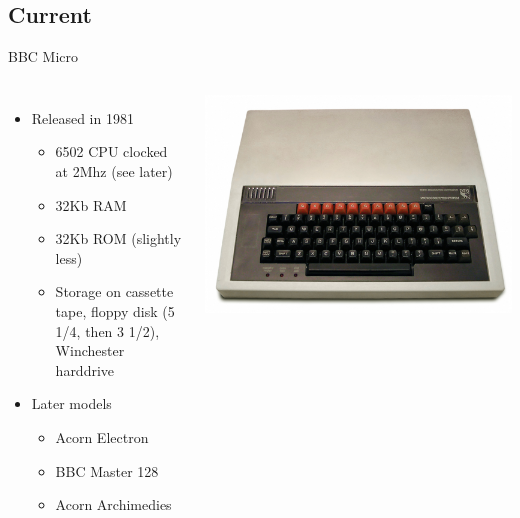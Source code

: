 \documentclass{beamer}
\begin{document}
\subsection[Modern]{Current}

\begin{frame}{BBC Micro}
  \begin{columns}
    
    \begin{itemize}
    \item
      Released in 1981
      \begin{itemize}
      \item
        6502 CPU clocked at 2Mhz (see later)
      \item
        32Kb RAM
      \item
        32Kb ROM (slightly less)
      \item
        Storage on cassette tape, floppy disk (5 1/4, then 3 1/2), Winchester harddrive
      \end{itemize}
    \item
      Later models
      \begin{itemize}
      \item
        Acorn Electron
      \item
        BBC Master 128
      \item
        Acorn Archimedies
      \end{itemize}
    \end{itemize}
    
    \begin{center}
      \includegraphics[scale=0.15]{../assets/BBC_Micro_Front_Restored.eps}
      \cite{BBCMicro}
    \end{center}
    
  \end{columns}
\end{frame}
\end{document}
